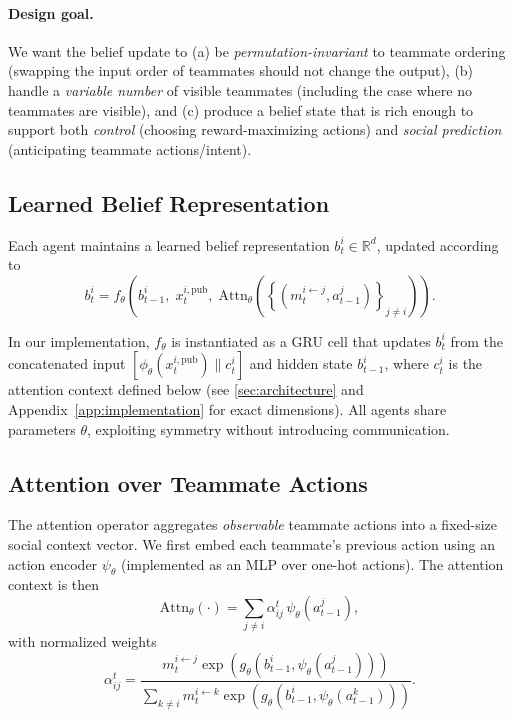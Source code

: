 \documentclass{article}
\theoremstyle{plain}
\theoremstyle{definition}
\theoremstyle{remark}
\begin{document}
\paragraph{Design goal.}
We want the belief update to (a) be \emph{permutation-invariant} to teammate ordering (swapping the input order of teammates should not change the output), (b) handle a \emph{variable number} of visible teammates (including the case where no teammates are visible), and (c) produce a belief state that is rich enough to support both \emph{control} (choosing reward-maximizing actions) and \emph{social prediction} (anticipating teammate actions/intent).

\subsection{Learned Belief Representation}

Each agent maintains a learned belief representation $b_t^i \in \mathbb{R}^d$, updated according to
\begin{equation}
b_t^i
=
f_\theta\!\left(
b_{t-1}^i,\;
x_t^{i,\mathrm{pub}},\;
\mathrm{Attn}_\theta\!\left(
\left\{ (m_t^{i \leftarrow j}, a_{t-1}^j) \right\}_{j \neq i}
\right)
\right).
\end{equation}

In our implementation, $f_\theta$ is instantiated as a GRU cell that updates $b_t^i$ from the concatenated input $[\phi_\theta(x_t^{i,\mathrm{pub}}) \parallel c_t^i]$ and hidden state $b_{t-1}^i$, where $c_t^i$ is the attention context defined below (see \cref{sec:architecture} and Appendix~\ref{app:implementation} for exact dimensions).
All agents share parameters $\theta$, exploiting symmetry without introducing communication.


\subsection{Attention over Teammate Actions}
The attention operator aggregates \emph{observable} teammate actions into a fixed-size social context vector.
We first embed each teammate's previous action using an action encoder $\psi_\theta$ (implemented as an MLP over one-hot actions).
The attention context is then
\begin{equation}
\mathrm{Attn}_\theta(\cdot)
=
\sum_{j \neq i} \alpha_{ij}^t \, \psi_\theta(a_{t-1}^j),
\end{equation}
with normalized weights
\begin{equation}
\alpha_{ij}^t
=
\frac{
 m_t^{i \leftarrow j}
\exp\!\left(
 g_\theta\!\left(b_{t-1}^i, \psi_\theta(a_{t-1}^j)\right)
\right)
}{
\sum\limits_{k \neq i}
 m_t^{i \leftarrow k}
\exp\!\left(
 g_\theta\!\left(b_{t-1}^i, \psi_\theta(a_{t-1}^k)\right)
\right)
}.
\end{equation}
\end{document}
